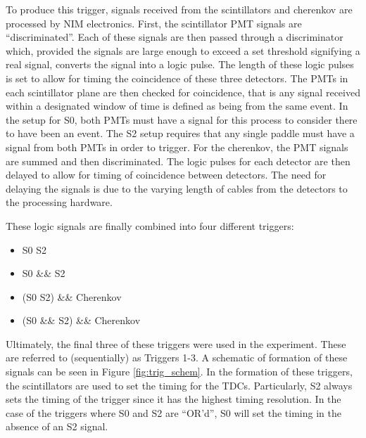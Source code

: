 To produce this trigger, signals received from the scintillators and cherenkov are processed by NIM electronics. First, the scintillator PMT signals are ``discriminated''. Each of these signals are then passed through a discriminator which, provided the signals are large enough to exceed a set threshold signifying a real signal, converts the signal into a logic pulse. The length of these logic pulses is set to allow for timing the coincidence of these three detectors. The PMTs in each scintillator plane are then checked for coincidence, that is any signal received within a designated window of time is defined as being from the same event. In the setup for S0, both PMTs must have a signal for this process to consider there to have been an event. The S2 setup requires that any single paddle must have a signal from both PMTs in order to trigger. For the cherenkov, the PMT signals are summed and then discriminated. The logic pulses for each detector are then delayed to allow for timing of coincidence between detectors. The need for delaying the signals is due to the varying length of cables from the detectors to the processing hardware.

These logic signals are finally combined into four different triggers:
\begin{itemize}
	\item S0 \textbar\textbar{} S2
	\item S0 \&\& S2
	\item (S0 \textbar\textbar{} S2) \&\& Cherenkov
	\item (S0 \&\& S2) \&\& Cherenkov
\end{itemize}
Ultimately, the final three of these triggers were used in the experiment. These are referred to (sequentially) as Triggers 1-3. A schematic of formation of these signals can be seen in Figure \ref{fig:trig_schem}. In the formation of these triggers, the scintillators are used to set the timing for the TDCs. Particularly, S2 always sets the timing of the trigger since it has the highest timing resolution. In the case of the triggers where S0 and S2 are ``OR'd'', S0 will set the timing in the absence of an S2 signal.

